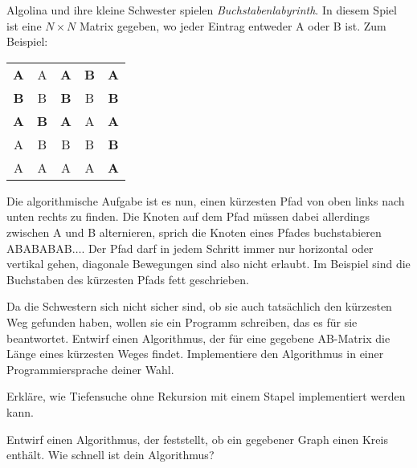 \documentclass{uebung_cs}
\begin{document}
\begin{aufgabe}[Buchstabenlabyrinth]
	Algolina und ihre kleine Schwester spielen \emph{Buchstabenlabyrinth}.
	In diesem Spiel ist eine $N\times N$ Matrix gegeben, wo jeder Eintrag entweder A oder B ist. Zum Beispiel:
	\begin{center}
		\begin{tabular}{ccccc}
			\textbf{A} & A & \textbf{A} & \textbf{B} & \textbf{A}\\
			\textbf{B} & B & \textbf{B} & B & \textbf{B}\\
			\textbf{A} & \textbf{B} & \textbf{A} & A & \textbf{A}\\
			A & B & B & B & \textbf{B}\\
			A & A & A & A & \textbf{A}
		\end{tabular}
	\end{center}

	Die algorithmische Aufgabe ist es nun, einen kürzesten Pfad von oben links nach unten rechts zu finden.
	Die Knoten auf dem Pfad müssen dabei allerdings zwischen A und B alternieren, sprich die Knoten eines Pfades buchstabieren ABABABAB$\ldots$.
	Der Pfad darf in jedem Schritt immer nur horizontal oder vertikal gehen, diagonale Bewegungen sind also nicht erlaubt.
	Im Beispiel sind die Buchstaben des kürzesten Pfads fett geschrieben.

	Da die Schwestern sich nicht sicher sind, ob sie auch tatsächlich den kürzesten Weg gefunden haben, wollen sie ein Programm schreiben, das es für sie beantwortet.
	Entwirf einen Algorithmus, der für eine gegebene AB-Matrix die Länge eines kürzesten Weges findet.
	Implementiere den Algorithmus in einer Programmiersprache deiner Wahl.
\end{aufgabe}

\begin{aufgabe}
	Erkläre, wie Tiefensuche ohne Rekursion mit einem Stapel implementiert werden kann.
\end{aufgabe}

\begin{aufgabe}
	Entwirf einen Algorithmus, der feststellt, ob ein gegebener Graph einen Kreis enthält.
	Wie schnell ist dein Algorithmus?
\end{aufgabe}
\end{document}
